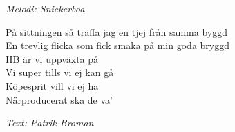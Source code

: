 {\footnotesize\textit{Melodi: Snickerboa}}\par
\vspace{10pt}
På sittningen så träffa jag en tjej från samma byggd\\
En trevlig flicka som fick smaka på min goda bryggd\\
HB är vi uppväxta på\\
Vi super tills vi ej kan gå\\
Köpesprit vill vi ej ha\\
Närproducerat ska de va'\par
\vspace{10pt}
{\footnotesize\textit{Text: Patrik Broman}}
